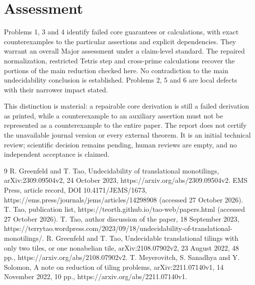 \documentclass[10pt]{article}
\begin{document}
\section*{Assessment}
Problems 1, 3 and 4 identify failed core guarantees or calculations, with exact counterexamples to the particular assertions and explicit dependencies. They warrant an overall Major assessment under a claim-level standard. The repaired normalization, restricted Tetris step and cross-prime calculations recover the portions of the main reduction checked here. No contradiction to the main undecidability conclusion is established. Problems 2, 5 and 6 are local defects with their narrower impact stated.\par
This distinction is material: a repairable core derivation is still a failed derivation as printed, while a counterexample to an auxiliary assertion must not be represented as a counterexample to the entire paper. The report does not certify the unavailable journal version or every external theorem. It is an initial technical review; scientific decision remains pending, human reviews are empty, and no independent acceptance is claimed.\par
9 R. Greenfeld and T. Tao, Undecidability of translational monotilings, arXiv:2309.09504v2, 24 October 2023, https://arxiv.org/abs/2309.09504v2. EMS Press, article record, DOI 10.4171/JEMS/1673, https://ems.press/journals/jems/articles/14298908 (accessed 27 October 2026). T. Tao, publication list, https://teorth.github.io/tao-web/papers.html (accessed 27 October 2026). T. Tao, author discussion of the paper, 18 September 2023, https://terrytao.wordpress.com/2023/09/18/undecidability-of-translational-monotilings/. R. Greenfeld and T. Tao, Undecidable translational tilings with only two tiles, or one nonabelian tile, arXiv:2108.07902v2, 23 August 2022, 48 pp., https://arxiv.org/abs/2108.07902v2. T. Meyerovitch, S. Sanadhya and Y. Solomon, A note on reduction of tiling problems, arXiv:2211.07140v1, 14 November 2022, 10 pp., https://arxiv.org/abs/2211.07140v1.\par
\end{document}
